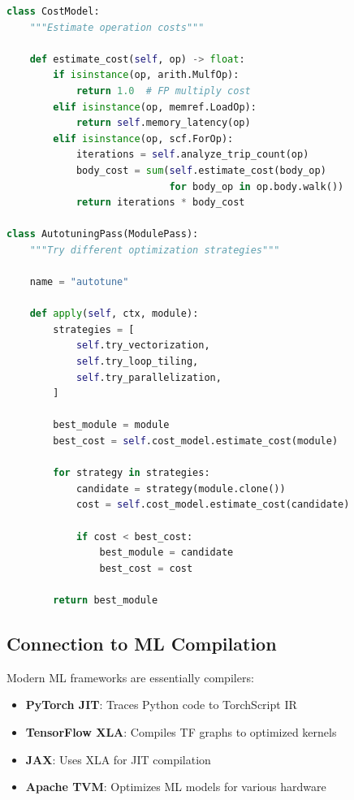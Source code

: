 \documentclass[11pt,a4paper]{article}
\begin{document}
\begin{lstlisting}[language=Python, caption=Cost-Based Optimization]
class CostModel:
    """Estimate operation costs"""

    def estimate_cost(self, op) -> float:
        if isinstance(op, arith.MulfOp):
            return 1.0  # FP multiply cost
        elif isinstance(op, memref.LoadOp):
            return self.memory_latency(op)
        elif isinstance(op, scf.ForOp):
            iterations = self.analyze_trip_count(op)
            body_cost = sum(self.estimate_cost(body_op)
                            for body_op in op.body.walk())
            return iterations * body_cost

class AutotuningPass(ModulePass):
    """Try different optimization strategies"""

    name = "autotune"

    def apply(self, ctx, module):
        strategies = [
            self.try_vectorization,
            self.try_loop_tiling,
            self.try_parallelization,
        ]

        best_module = module
        best_cost = self.cost_model.estimate_cost(module)

        for strategy in strategies:
            candidate = strategy(module.clone())
            cost = self.cost_model.estimate_cost(candidate)

            if cost < best_cost:
                best_module = candidate
                best_cost = cost

        return best_module
\end{lstlisting}

\subsection{Connection to ML Compilation}

Modern ML frameworks are essentially compilers:

\begin{itemize}
    \item \textbf{PyTorch JIT}: Traces Python code to TorchScript IR
    \item \textbf{TensorFlow XLA}: Compiles TF graphs to optimized kernels
    \item \textbf{JAX}: Uses XLA for JIT compilation
    \item \textbf{Apache TVM}: Optimizes ML models for various hardware
\end{itemize}
\end{document}
